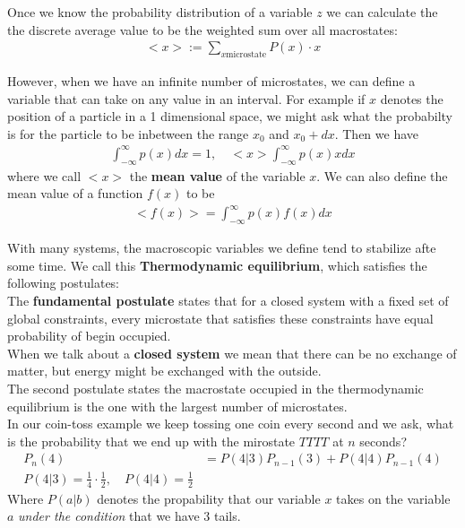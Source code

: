Once we know the probability distribution of a variable $z$ we can calculate the the discrete average value to be the weighted sum over all macrostates:
\begin{align*}
	<x> := \sum_{x \text{microstate}} P(x) \cdot x
\end{align*}

However, when we have an infinite number of microstates, we can define a variable that can take on any value in an interval. For example if $x$ denotes the position of a particle in a 1 dimensional space, we might ask what the probabilty is for the particle to be inbetween the range $x_0$ and $x_0 + dx$. Then we have
\begin{align*}
	\int_{-\infty}^{\infty}p(x) dx = 1, \quad <x> \int_{-\infty}^{\infty}p(x) x dx
\end{align*}
where we call $<x>$ the \textbf{mean value} of the variable $x$. We can also define the mean value of a function $f(x)$ to be
\begin{align*}
	<f(x)> = \int_{-\infty}^{\infty}p(x) f(x) dx
\end{align*}


With many systems, the macroscopic variables we define tend to stabilize afte some time. We call this \textbf{Thermodynamic equilibrium}, which satisfies the following postulates:\\
The \textbf{fundamental postulate} states that for a closed system with a fixed set of global constraints, every microstate that satisfies these constraints have equal probability of begin occupied.\\

When we talk about a \textbf{closed system} we mean that there can be no exchange of matter, but energy might be exchanged with the outside.\\

The second postulate states the macrostate occupied in the thermodynamic equilibrium is the one with the largest number of microstates.\\


In our coin-toss example we keep tossing one coin every second and we ask, what is the probability that we end up with the mirostate $TTTT$ at $n$ seconds?
\begin{align*}
	P_n(4) &= P(4|3) P_{n-1}(3) + P(4|4) P_{n-1}(4)\\
	P(4|3) = \frac{1}{4} \cdot \frac{1}{2}, \quad P(4|4) = \frac{1}{2}
\end{align*}
Where $P(a|b)$ denotes the propability that our variable $x$ takes on the variable $a$ \emph{under the condition} that we have $3$ tails.

